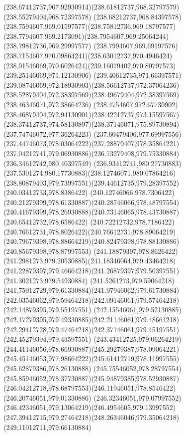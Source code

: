 {{	\curveto(238.67412737,967.92930914)(238.61812737,968.32797579)(238.55279404,968.72397578)
	\curveto(238.68212737,968.84397578)(238.7594607,969.01597577)(238.75812736,969.18797577)
	\curveto(238.7794607,969.2173091)(238.7954607,969.25064244)(238.79812736,969.29997577)
	\curveto(238.7994607,969.69197576)(238.7154607,970.09864241)(238.63012737,970.4946424)
	\curveto(238.91546069,970.6026424)(239.16079402,970.80797573)(239.25146069,971.12130906)
	\curveto(239.40612735,971.66397571)(239.08746069,972.18930903)(238.56612737,972.37064236)
	\curveto(238.52879404,972.38397569)(238.49679404,972.38397569)(238.46346071,972.38664236)
	\curveto(238.4754607,972.67730902)(238.46879404,972.94130901)(238.42212737,973.15597567)
	\curveto(238.37412737,974.58130897)(238.37146071,975.89730894)(237.74746072,977.36264223)
	\curveto(237.60479406,977.69997556)(237.44746073,978.03064222)(237.28879407,978.35864221)
	\curveto(237.04212741,979.06930886)(236.73279408,979.75330884)(236.34612742,980.40397549)
	\curveto(236.93412741,980.27730883)(237.5301274,980.17730883)(238.12746071,980.07864216)
	\curveto(238.80879403,979.73997551)(239.44612735,979.28397552)(240.03412733,978.8386422)
	\curveto(240.12746066,978.7306422)(240.21279399,978.61330887)(240.28746066,978.48797554)
	\curveto(240.41679399,978.26930888)(240.73146065,978.43730887)(240.65412732,978.6586422)
	\curveto(240.72212732,978.7186422)(240.76612731,978.8026422)(240.76612731,978.89064219)
	\curveto(240.79679398,978.88664219)(240.82479398,978.88130886)(240.85679398,978.87997553)
	\curveto(241.18879397,978.8626422)(241.2981273,979.20530885)(241.18346064,979.43464218)
	\curveto(241.22879397,979.46664218)(241.26879397,979.50397551)(241.3021273,979.54930884)
	\curveto(241.5261273,979.59064218)(241.75012729,979.61330884)(241.97946062,979.61730884)
	\curveto(242.03546062,979.59464218)(242.09146061,979.57464218)(242.14879395,979.55197551)
	\curveto(242.15546061,979.52130885)(242.17279395,979.49330885)(242.21146061,979.48664218)
	\curveto(242.29412728,979.47464218)(242.37146061,979.45197551)(242.45279394,979.43597551)
	\curveto(243.43412725,979.06264219)(244.41146056,978.66930887)(245.29279387,978.09064221)
	\curveto(245.45146053,977.98664222)(245.61412719,978.11997555)(245.62879386,978.26130888)
	\curveto(245.75546052,978.28797554)(245.85946052,978.37730887)(245.94879385,978.52930887)
	\curveto(246.04212718,978.68797553)(246.11946051,978.8546422)(246.20746051,979.01330886)
	\curveto(246.32346051,979.07997552)(246.42346051,979.13064219)(246.4954605,979.13997552)
	\curveto(247.39412715,979.27464218)(248.26346046,979.35064218)(249.11012711,979.66130884)
}}
